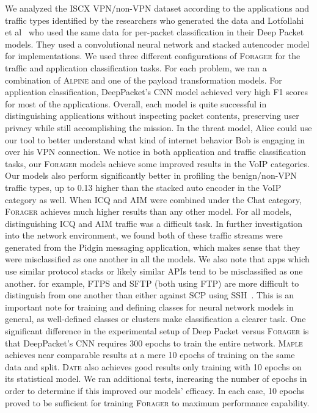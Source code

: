 We analyzed the ISCX VPN/non-VPN dataset according to the applications and traffic types identified by the researchers who generated the data and Lotfollahi et al~\cite{deeppacket} who used the same data for per-packet classification in their Deep Packet models. They used a convolutional neural network and stacked autencoder model for implementations. We used three different configurations of \textsc{Forager} for the traffic and application classification tasks. For each problem, we ran a combination of \textsc{Alpine} and one of the payload transformation models. For application classification, DeepPacket's CNN model achieved very high F1 scores for most of the applications. Overall, each model is quite successful in distinguishing applications without inspecting packet contents, preserving user privacy while still accomplishing the mission. In the threat model, Alice could use our tool to better understand what kind of internet behavior Bob is engaging in over his VPN connection. We notice in both application and traffic classification tasks, our \textsc{Forager} models achieve some improved results in the VoIP categories. Our models also perform significantly better in profiling the benign/non-VPN traffic types, up to 0.13 higher than the stacked auto encoder in the VoIP category as well. When ICQ and AIM were combined under the Chat category, \textsc{Forager} achieves much higher results than any other model. For all models, distinguishing ICQ and AIM traffic was a difficult task. In further investigation into the network environment, we found both of these traffic streams were generated from the Pidgin messaging application, which makes sense that they were misclassified as one another in all the models. We also note that apps which use similar protocol stacks or likely similar APIs tend to be misclassified as one another. for example, FTPS and SFTP (both using FTP) are more difficult to distinguish from one another than either against SCP using SSH~\cite{deeppacket}. This is an important note for training and defining classes for neural network models in general, as well-defined classes or clusters make classification a clearer task. One significant difference in the experimental setup of Deep Packet versus \textsc{Forager} is that DeepPacket's CNN requires 300 epochs to train the entire network. \textsc{Maple} achieves near comparable results at a mere 10 epochs of training on the same data and split. \textsc{Date} also achieves good results only training with 10 epochs on its statistical model. We ran additional tests, increasing the number of epochs in order to determine if this improved our models' efficacy. In each case, 10 epochs proved to be sufficient for training \textsc{Forager} to maximum performance capability.

